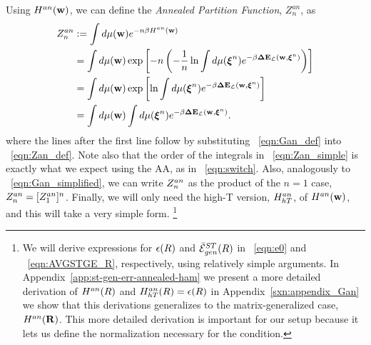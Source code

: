 Using $H^{an}({\mathbf{w}})$, we can define the \emph{Annealed Partition Function}, $Z^{an}_{n}$, as
\begin{align}
  \label{eqn:Zan_def}
  Z^{an}_{n} 
  &:=  \int d\mu({\mathbf{w}}) e^{-n\beta H^{an}({\mathbf{w}})} \\ \nonumber
  &=\int d\mu({\mathbf{w}}) \exp\left[-n \left(- \frac{1}{n}\ln  \int d\mu(\boldsymbol{\xi}^{n})e^{-\beta\mathbf{\Delta {E}}_{\mathcal{L}}(\mathbf{w}, \boldsymbol{\xi}^{n})}\right)\right] \\ \nonumber
  &=  \int d\mu({\mathbf{w}}) \exp\left[\ln  \int d\mu(\boldsymbol{\xi}^{n})e^{-\beta\mathbf{\Delta {E}}_{\mathcal{L}}(\mathbf{w}, \boldsymbol{\xi}^{n})}\right] \\ 
  \label{eqn:Zan_simple}
  &=  \int d\mu({\mathbf{w}})  \int d\mu(\boldsymbol{\xi}^{n})e^{-\beta\mathbf{\Delta {E}}_{\mathcal{L}}(\mathbf{w}, \boldsymbol{\xi}^{n})} .
\end{align}
where the lines after the first line follow by substituting \EQN~\ref{eqn:Gan_def} into \EQN~\ref{eqn:Zan_def}.
Note also that the order of the integrals in \EQN~\ref{eqn:Zan_simple} is exactly what we expect using the AA, as in \EQN~\ref{eqn:switch}.
Also, analogously to \EQN~\ref{eqn:Gan_simplified}, we can write $Z^{an}_{n}$ as the product of the $n=1$ case, $Z^{an}_{n}=[Z^{an}_{1}]^{n}$.
Finally, we will only need the high-T version, $H^{an}_{hT}$, of $H^{an}({\mathbf{w}})$, and this will take a very simple form.
\footnote{We will derive expressions for $\epsilon(R)$ and $\bar{\mathcal{E}}^{ST}_{gen}(R)$ in \EQN~\ref{eqn:e0} and \EQN~\ref{eqn:AVGSTGE_R}, respectively, using relatively simple arguments.
In Appendix~\ref{app:st-gen-err-annealed-ham} we present
a more detailed derivation of $H^{an}(R)$ and $H^{an}_{hT}(R)=\epsilon(R)$
in Appendix~\ref{sxn:appendix_Gan} we show that this derivations generalizes to the matrix-generalized case, $H^{an}(\mathbf{R})$.
This more detailed derivation is important for our \SETOL setup because it lets us define the normalization
necessary for the \TRACELOG condition.
}



